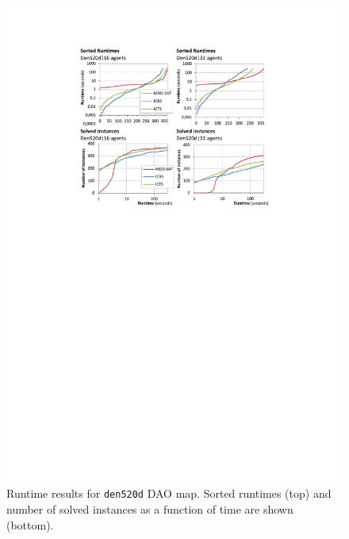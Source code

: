 \documentclass[jair,oneside,11pt]{article}
\begin{document}
\begin{figure}[h]
\centering
\includegraphics[trim={2.5cm 17.0cm 2.5cm 2.6cm},clip,width=1.0\textwidth]{expr_den520_sorted.pdf}
\vspace{-0.6cm}\caption{Runtime results for \texttt{den520d} DAO map. Sorted runtimes (top) and number of solved instances as a function of time are shown (bottom).}
\label{figure-den520-sorted}
\end{figure}
\end{document}
